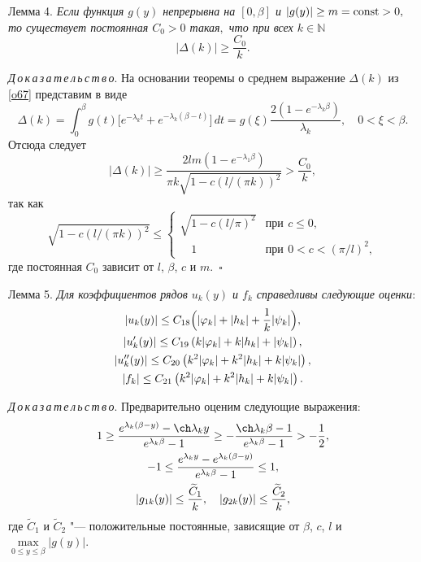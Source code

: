 \smallskip

\hypertarget{sab:lemma4}{}

{\small\sc Лемма 4.} \textit{Если функция $g(y)$ непрерывна на $[0,\beta]$ и ${|g(y)|\geq m=\rm const>0},$ то существует постоянная $C_0>0$ такая$,$ что при всех $k\in\mathbb{N}$}
\begin{equation}
\label{o75}
|\Delta(k)|\geq\frac{C_0}{k}.
\end{equation}

\smallskip



\textit{Д\,о\,к\,а\,з\,а\,т\,е\,л\,ь\,с\,т\,в\,о\/}. 
На основании теоремы о среднем выражение $\Delta(k)$ из \eqref{o67} представим в виде
$$
\Delta(k)=\int _{0}^{\beta}g(t)
\bigl[e^{-\lambda_kt}+e^{-\lambda_k(\beta-t)}\bigr]\,dt= 
g(\xi)\frac{2(1-e^{-\lambda_k\beta})}{\lambda_k}, \quad  0<\xi<\beta.
$$
Отсюда следует
$$
|\Delta(k)|\geq\frac{2lm(1-e^{-\lambda_1\beta})}{\pi k\sqrt{1-c(l/(\pi k))^2}}>\frac{C_0}{k},
$$
так как
$$
\sqrt{1-c(l/(\pi k))^2}\leq
\begin{cases}
      \sqrt{1-c(l/\pi)^2} & \text{при}\,\ c\leq0, \\
      \,\,\,\,\,\,1 & \text{при}\,\ 0<c<(\pi/l)^2,
\end{cases}
$$
где постоянная $C_0$ зависит от $l$, $\beta$, $c$ и $m$.~$\square$

\smallskip


\hypertarget{sab:lemma5}{}

{\small\sc Лемма 5.} \textit{Для коэффициентов рядов $u_k(y)$ и $f_k$ справедливы следующие оценки}\/:
\begin{gather}\label{o76}
|u_k(y)|\leq C_{18}\Bigl(|\varphi_k|+|h_k|+\frac{1}{k}|\psi_k|\Bigr),
\\
\label{o79}
|u'_k(y)|\leq C_{19}\left(k|\varphi_k|+k|h_k|+|\psi_k|\right),
\\
\label{o79}
|u''_k(y)|\leq C_{20}\left(k^2|\varphi_k|+k^2|h_k|+k|\psi_k|\right),
\\
\label{o79}
|f_k|\leq C_{21}\left(k^2|\varphi_k|+k^2|h_k|+k|\psi_k|\right).
\end{gather}

\textit{Д\,о\,к\,а\,з\,а\,т\,е\,л\,ь\,с\,т\,в\,о\/}.  
Предварительно оценим следующие выражения:
\begin{gather}
1\geq\frac{e^{\lambda_k(\beta-y)}-\ch\lambda_ky}{e^{\lambda_k\beta}-1}\geq -\frac{\ch\lambda_k\beta-1}{e^{\lambda_k\beta}-1}>-\frac{1}{2},
\\
-1\leq\frac{e^{\lambda_ky}-e^{\lambda_k(\beta-y)}}{e^{\lambda_k\beta}-1}\leq1,
\\
|g_{1k}(y)|\leq\frac{\widetilde{C}_1}{k},\quad  |g_{2k}(y)|\leq\frac{\widetilde{C}_2}{k},
\end{gather}
где $\widetilde{C}_1$ и $\widetilde{C}_2$ "--- положительные постоянные, зависящие от $\beta$, $c$, $l$ и $\max\limits_{0\leq y\leq\beta}|g(y)|$.

